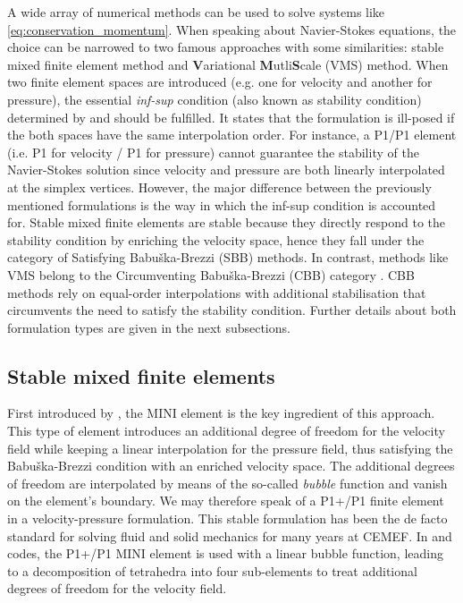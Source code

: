 A wide array of numerical methods can be used to solve systems like \cref{eq:conservation_momentum}. 
When speaking about Navier-Stokes equations, the choice can be narrowed to two famous
approaches with some similarities: stable mixed finite element method and \textbf{V}ariational \textbf{M}utli\textbf{S}cale (VMS) method.
When two finite element spaces are introduced (e.g. one for velocity and another for pressure), 
the essential \emph{inf-sup} condition (also known as stability condition) determined by \citet{babuska_error-bounds_1971} and \citet{brezzi_existence_1974} 
should be fulfilled. It states that the formulation is ill-posed if the both spaces have the same interpolation 
order. For instance, a P1/P1 element (i.e. P1 for velocity / P1 for pressure) cannot guarantee the stability of the Navier-Stokes solution since
velocity and pressure are both linearly interpolated at the simplex vertices.
However, the major difference between the previously mentioned formulations is the way in which the inf-sup condition is accounted for.
Stable mixed finite elements are stable because they directly respond to the stability condition by enriching the velocity space, 
hence they fall under the category of Satisfying Babuška-Brezzi (SBB) methods. In contrast, methods like VMS belong to the
Circumventing Babuška-Brezzi (CBB) category \citep{barbosa_finite_1991}.
CBB methods rely on equal-order interpolations with additional stabilisation that circumvents the need to satisfy the stability condition.
Further details about both formulation types are given in the next subsections.

\subsection{Stable mixed finite elements}

First introduced by \citet{arnold_stable_1984}, the MINI element is the key ingredient of this approach.
This type of element introduces an additional degree of freedom for the velocity field while keeping a linear
interpolation for the pressure field, thus satisfying the Babuška-Brezzi condition with an enriched velocity space.
The additional degrees of freedom are interpolated by means of the so-called \emph{bubble} function and vanish on the element's boundary.
We may therefore speak of a P1+/P1 finite element in a velocity-pressure formulation. 
This stable formulation has been the de facto standard for solving fluid 
and solid mechanics for many years at CEMEF. In \forge and \thercast codes, the P1+/P1 MINI element is used with a linear bubble function, leading to a 
decomposition of tetrahedra into four sub-elements to treat additional degrees of freedom for the velocity field.

